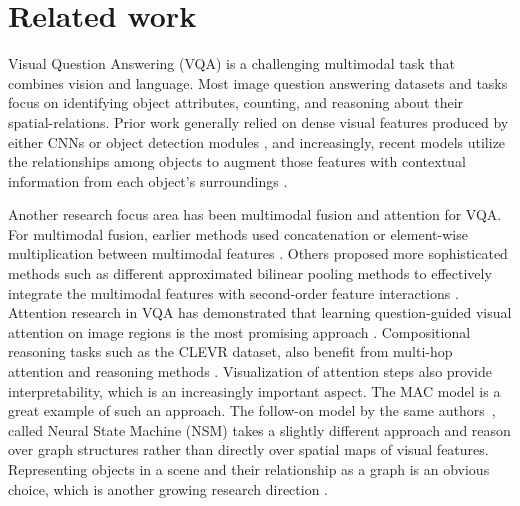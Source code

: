 

\section{Related work}
Visual Question Answering (VQA) is a challenging multimodal task that combines vision and language. Most image question answering datasets and tasks focus on identifying object attributes, counting, and reasoning about their spatial-relations. Prior work generally relied on dense visual features produced by either CNNs \cite{xiong2016dynamic,yang2016stacked} or object detection modules \cite{desta2018object}, and increasingly, recent models utilize the relationships among objects to augment those features with contextual information from each object’s surroundings \cite{teney2017graph, santoro2017simple}.  

Another research focus area has been multimodal fusion and
attention for VQA. For multimodal fusion, earlier methods used concatenation or element-wise multiplication between multimodal
features \cite{zhou2015simple, antol2015}. Others proposed more sophisticated methods such as different approximated bilinear pooling methods to effectively integrate the multimodal features with second-order feature interactions \cite{fukui2016multimodal, kim2016hadamard}. Attention  research in VQA has demonstrated that learning question-guided visual attention on image regions is the most promising approach \cite{yang2016stacked, chen2015abc, ilievski2016focused}. Compositional reasoning tasks such as the CLEVR dataset, also benefit from multi-hop attention and reasoning methods \cite{hudson2018compositional, song2018explore}. Visualization of attention steps also provide interpretability, which is an increasingly important aspect. The MAC model \cite{hudson2018compositional} is a great example of such an approach. The follow-on model by the same authors~\cite{hudson2019learning}, called Neural State Machine (NSM) takes a slightly different approach and reason over graph structures rather than directly over spatial maps of visual features. Representing objects in a scene and their relationship as a graph is an obvious choice, which is another growing research direction \cite{haurilet2019s, teney2017graph, kim2018dynamic}. 

